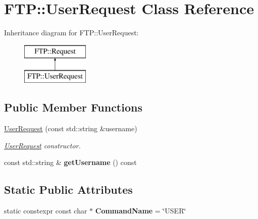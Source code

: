 \hypertarget{class_f_t_p_1_1_user_request}{\section{F\-T\-P\-:\-:User\-Request Class Reference}
\label{class_f_t_p_1_1_user_request}
}
Inheritance diagram for F\-T\-P\-:\-:User\-Request\-:\begin{figure}[H]
\begin{center}
\leavevmode
\includegraphics[height=2.000000cm]{class_f_t_p_1_1_user_request}
\end{center}
\end{figure}
\subsection*{Public Member Functions}
\begin{DoxyCompactItemize}
\item 
\hyperlink{class_f_t_p_1_1_user_request_a385e73c2e46f88f757c20748a0f52a0f}{User\-Request} (const std\-::string \&username)
\begin{DoxyCompactList}\small\item\em \hyperlink{class_f_t_p_1_1_user_request}{User\-Request} constructor. \end{DoxyCompactList}\item 
\hypertarget{class_f_t_p_1_1_user_request_a0a795f933d6b956aa1ea20e41f22f45b}{const std\-::string \& {\bfseries get\-Username} () const }\label{class_f_t_p_1_1_user_request_a0a795f933d6b956aa1ea20e41f22f45b}

\end{DoxyCompactItemize}
\subsection*{Static Public Attributes}
\begin{DoxyCompactItemize}
\item 
\hypertarget{class_f_t_p_1_1_user_request_a1d62befcdffbc41a256e92954fa0fb4c}{static constexpr const char $\ast$ {\bfseries Command\-Name} = \char`\"{}U\-S\-E\-R\char`\"{}}\label{class_f_t_p_1_1_user_request_a1d62befcdffbc41a256e92954fa0fb4c}

\end{DoxyCompactItemize}


